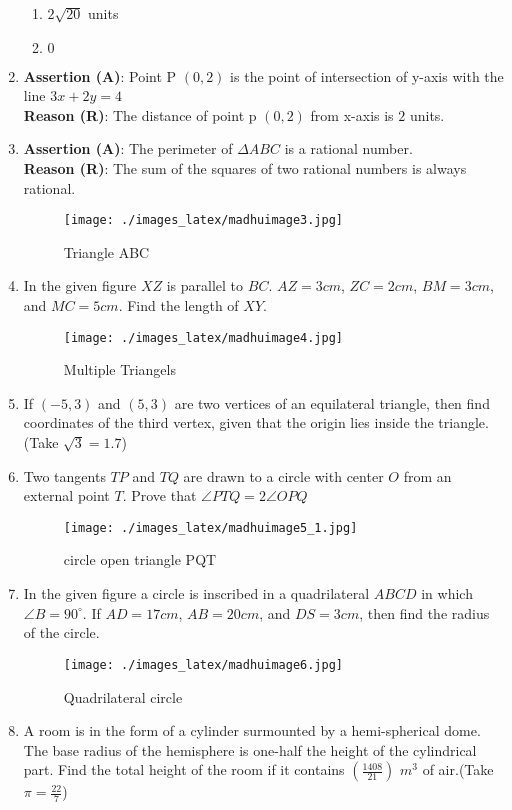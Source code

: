 \documentclass{article}
\begin{document}
\begin{enumerate}
\begin{enumerate}
 \item $2\sqrt{20}$ units 
 \item $0$
 \end{enumerate}
 \item  \textbf{Assertion (A)}: Point P $(0,2)$ is the point of intersection of y-axis with the line ${3x+2y=4}$ \\
 \textbf{ Reason (R)}: The distance of point p $(0,2)$ from x-axis is $2$ units.
\item \textbf{Assertion (A)}: The perimeter of  $\Delta {ABC}$  is a rational number.\\
\textbf{Reason (R)}: The sum of the squares of two rational numbers is always rational. 
\begin{figure}[H] 
\centering 
\texttt{[image: ./images\_latex/madhuimage3.jpg]}  
\label{fig:fig3} 
\caption{Triangle ABC}
\end{figure}
\item In the given figure $XZ$ is parallel to $BC$. $AZ=3 cm$, $ZC=2 cm$, $BM=3 cm$, and $MC=5 cm$. Find the length of $XY$.
\begin{figure}[H] 
\centering
\texttt{[image: ./images\_latex/madhuimage4.jpg]}  
\label{fig:fig4} 
\caption{ Multiple Triangels}
\end{figure}
\item If $(-5, 3)$ and $(5, 3)$ are two vertices of an equilateral triangle, then find coordinates of the third vertex, given that the origin lies inside the triangle. (Take $\sqrt{3} = 1.7$)
\item Two tangents $TP$ and $TQ$ are drawn to a circle with center $O$ from an external point $T$. Prove that $\angle PTQ = 2\angle OPQ$ 
\begin{figure}[H] 
\centering
\texttt{[image: ./images\_latex/madhuimage5\_1.jpg]}  
\label{fig:fig5}
\caption{circle open triangle PQT}
\end{figure}
\item In the given figure a circle is inscribed in a quadrilateral $ABCD$ in which $\angle B=90^\circ$. If $AD=17 cm$, $AB=20 cm$, and $DS=3 cm$, then find the radius of the circle.
\begin{figure}[H]
\centering
\texttt{[image: ./images\_latex/madhuimage6.jpg]}  
\label{fig:fig6}
\caption{Quadrilateral circle}
\end{figure}
\item A room is in the form of a cylinder surmounted by a hemi-spherical dome. The base radius of the hemisphere is one-half the height of the cylindrical part. Find the total height of the room if it contains  $(\frac{1408}{21})$ $m^3$ of air.(Take$\pi = \frac{22}{7}$)

\end{enumerate}
\end{document}
